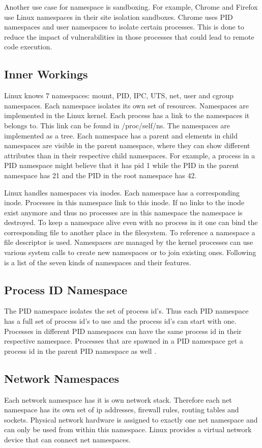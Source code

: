 \documentclass[10pt,twocolumn,a4paper]{article}
\begin{document}
Another use case for namespace is sandboxing. For example, Chrome and Firefox use Linux namespaces
in their site isolation sandboxes. 
Chrome uses PID namespaces and user namespaces to isolate certain processes.
This is done to reduce the impact of vulnerabilities in those processes that could lead to remote code execution.


\subsection{Inner Workings}
Linux knows 7 namespaces: mount, PID, IPC, UTS, net, user and cgroup namespaces. Each namespace isolates its own set of resources. Namespaces are implemented in the Linux kernel.
Each process has a link to the namespaces it belongs to. This link can be found in /proc/self/ns\cite{8}. The namespaces are implemented as a tree. Each namespace has a parent and 
elements in child namespaces are visible in the parent namespace, where they can show different
attributes than in their respective child namespaces. For example, a process in a PID namespace might 
believe that it has pid 1 while the PID in the parent namespace has 21 and the PID in the root
namespace has 42.

Linux handles namespaces via inodes. Each namespace has a corresponding inode. Processes in this
namespace link to this inode. If no links to the inode exist anymore and thus no processes are in
this namespace the namespace is destroyed. To keep a namespace alive even with no process in it
one can bind the corresponding file to another place in the filesystem. To reference a namespace a
file descriptor is used. Namespaces are managed by the kernel processes can use various system
calls to create new namespaces or to join existing ones.\cite{8} Following is a list of the seven
kinds of namespaces and their features.


\subsection{Process ID Namespace}
The PID namespace isolates the set of process id's. 
Thus each PID namespace has a full set of process id's to use and  the process id's can start with one.
Processes in different PID namespaces can have the same process id in their respective namespace. 
Processes that are spawned in a PID namespace get a process id in the parent PID namespace as well 
\cite{11}.

\subsection{Network Namespaces}
Each network namespace has it is own network stack. Therefore each net namespace has its own set of ip
addresses, firewall rules, routing tables and sockets. Physical network hardware is assigned to exactly one
net namespace and can only be used from within this namespace. Linux provides a virtual network
 device that can connect net namespaces.\cite{10}
\end{document}
